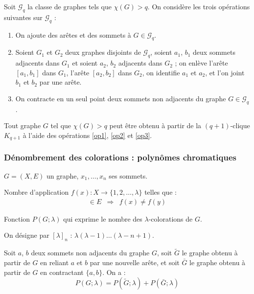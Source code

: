 Soit $\mathcal{G}_q$ la classe de graphes tels que $\chi(G)>q$. On considère les trois
opérations suivantes sur $\mathcal{G}_q$ :
\begin{enumerate}
 \item\label{op1} On ajoute des arêtes et des sommets à $G\in\mathcal{G}_q$.
 \item\label{op2} Soient $G_1$ et $G_2$ deux graphes disjoints de $\mathcal{G}_q$, soient $a_1$, $b_1$ deux
sommets adjacents dans $G_1$ et soient $a_2$, $b_2$ adjacents dans $G_2$ ; on enlève l'arête $[a_1, b_1]$
dans $G_1$, l'arête $[a_2,b_2]$ dans $G_2$, on identifie $a_1$ et $a_2$, et l'on joint $b_1$ et $b_2$ par
une arête.
 \item\label{op3} On contracte en un seul point deux sommets non adjacents du graphe $G \in \mathcal{G}_q$.
\end{enumerate}

\begin{theorem}[Haj\'{o}s, 1961]
Tout graphe $G$ tel que $\chi(G)>q$ peut être obtenu à partir de la $(q+1)$-clique $K_{q+1}$ à
l'aide des opérations \ref{op1}, \ref{op2} et \ref{op3}.
\end{theorem}

\subsubsection{Dénombrement des colorations : polynômes chromatiques}
\setcounter{prop}{0}
$G=(X,E)$ un graphe, $x_1,\dots,x_n$ ses sommets.

\begin{defin}
Nombre d'application $f(x) : X \longrightarrow \{1,2,\dots,\lambda\}$ telles que :
\begin{eqnarray*}
[x,y]\in E & \Rightarrow & f(x)\neq f(y)
\end{eqnarray*}
\end{defin}

\begin{defin}
Fonction $P(G; \lambda)$ qui exprime le nombre des $\lambda$-colorations de $G$.
\end{defin}

\begin{rmq}
On désigne par $[\lambda]_n$ : $\lambda(\lambda-1)\dots(\lambda-n+1)$.
\end{rmq}

\begin{prop}
Soit $a$, $b$ deux sommets non adjacents du graphe $G$, soit $\tilde G$ le
graphe obtenu à partir de $G$ en reliant $a$ et $b$ par une nouvelle arête, et
soit $\bar G$ le graphe obtenu à partir de $G$ en contractant $\{a,b\}$. On a :
$$P(G;\lambda)=P(\tilde G;\lambda)+P(\bar G;\lambda)$$
\end{prop}

